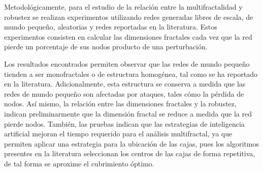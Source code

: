 Metodológicamente, para el estudio de la relación entre la multifractalidad y robustez se realizan experimentos utilizando redes generadas libres de escala, de mundo pequeño, aleatorias y redes reportadas en la literatura. Estos experimentos consisten en calcular las dimensiones fractales cada vez que la red pierde un porcentaje de sus nodos producto de una perturbación. 

Los resultados encontrados permiten observar que las redes de mundo pequeño tienden a ser monofractales o de estructura homogénea, tal como se ha reportado en la literatura. Adicionalmente, esta estructura se conserva a medida que las redes de mundo pequeño son afectadas por ataques, tales cómo la pérdida de nodos. Así mismo, la relación entre las dimensiones fractales y la robustez, indican preliminarmente que la dimensión fractal se reduce a medida que la red pierde nodos. También, las pruebas indican que las estrategias de inteligencia artificial mejoran el tiempo requerido para el análisis multifractal, ya que permiten aplicar una estrategia para la ubicación de las cajas, pues los algoritmos presentes en la literatura seleccionan los centros de las cajas de forma repetitiva, de tal forma se aproxime el cubrimiento óptimo.